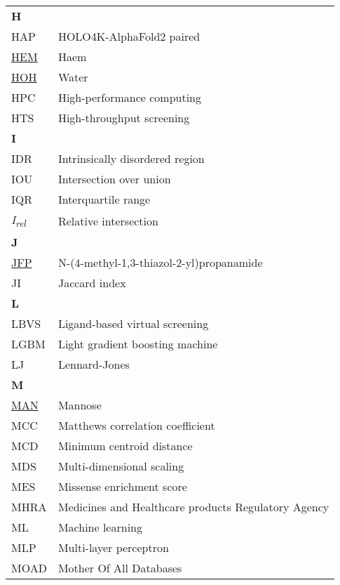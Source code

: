 \begin{longtable}[l]{@{}p{2.5cm}p{12cm}@{}}
\textbf{\large H} & \\[0.25cm]
\textmd{HAP} & HOLO4K-AlphaFold2 paired \\
\textmd{\href{https://www.ebi.ac.uk/pdbe-srv/pdbechem/chemicalCompound/show/HEM}{HEM}} & Haem \\
\textmd{\href{https://www.ebi.ac.uk/pdbe-srv/pdbechem/chemicalCompound/show/HOH}{HOH}} & Water \\
\textmd{HPC} & High-performance computing \\
\textmd{HTS} & High-throughput screening \\[0.3175cm]
\textbf{\large I} & \\[0.25cm]
\textmd{IDR} & Intrinsically disordered region \\
\textmd{IOU} & Intersection over union \\
\textmd{IQR} & Interquartile range \\
\textmd{\textit{I\textsubscript{rel}}} & Relative intersection \\[0.3175cm]
\textbf{\large J} & \\[0.25cm]
\textmd{\href{https://www.ebi.ac.uk/pdbe-srv/pdbechem/chemicalCompound/show/JFP}{JFP}} & N-(4-methyl-1,3-thiazol-2-yl)propanamide \\
\textmd{JI} & Jaccard index \\[0.3175cm]
\textbf{\large L} & \\[0.25cm]
\textmd{LBVS} & Ligand-based virtual screening \\
\textmd{LGBM} & Light gradient boosting machine \\
\textmd{LJ} & Lennard-Jones \\[0.3175cm]
\textbf{\large M} & \\[0.25cm]
\textmd{\href{https://www.ebi.ac.uk/pdbe-srv/pdbechem/chemicalCompound/show/MAN}{MAN}} & Mannose \\
\textmd{MCC} & Matthews correlation coefficient \\
\textmd{MCD} & Minimum centroid distance \\
\textmd{MDS} & Multi-dimensional scaling \\
\textmd{MES} & Missense enrichment score \\
\textmd{MHRA} & Medicines and Healthcare products Regulatory Agency \\
\textmd{ML} & Machine learning \\
\textmd{MLP} & Multi-layer perceptron \\
\textmd{MOAD} & Mother Of All Databases \\

\end{longtable}

